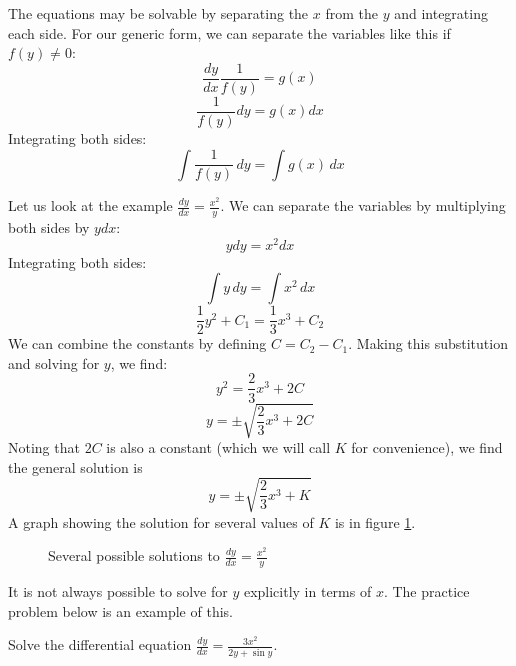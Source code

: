 The equations may be solvable by separating the $x$ from the $y$ and 
integrating each side. For our generic form, we can separate the 
variables like this if $f(y) \neq 0$: 
$$\frac{dy}{dx}\frac{1}{f(y)} = g(x)$$ 
$$\frac{1}{f(y)}dy = g(x) dx$$
Integrating both sides: $$\int \frac{1}{f(y)}\,dy = \int g(x)\,dx$$

Let us look at the example $\frac{dy}{dx} = \frac{x^2}{y}$. We can 
separate the variables by multiplying both sides by $y dx$: 
$$y dy = x^2 dx$$
Integrating both sides: 
$$\int y\,dy = \int x^2\,dx$$
$$\frac{1}{2}y^2 + C_1 = \frac{1}{3}x^3 + C_2$$
We can combine the constants by defining $C = C_2 - C_1$. Making this 
substitution and solving for $y$, we find: 
$$y^2 = \frac{2}{3} x^3 + 2C$$ 
$$y = \pm\sqrt{\frac{2}{3} x^3 + 2C}$$
Noting that $2C$ is also a constant (which we will call $K$ for 
convenience), we find the general solution is 
$$y = \pm\sqrt{\frac{2}{3} x^3 + K}$$
A graph showing the solution for several values of $K$ is in figure 
\ref{fig:solutions}.

\begin{figure}[H]
\centering
    \caption{Several possible solutions to $\frac{dy}{dx} = 
    \frac{x^2}{y}$}
    \label{fig:solutions}
\end{figure}

It is not always possible to solve for $y$ explicitly in terms of 
$x$. The practice problem below is an example of this. 

\begin{Exercise}[label = diffeq1]
	Solve the differential equation $\frac{dy}{dx} = \frac{3x^2}{2y + \sin{y}}$. 
	\vspace{50mm}
\end{Exercise}

